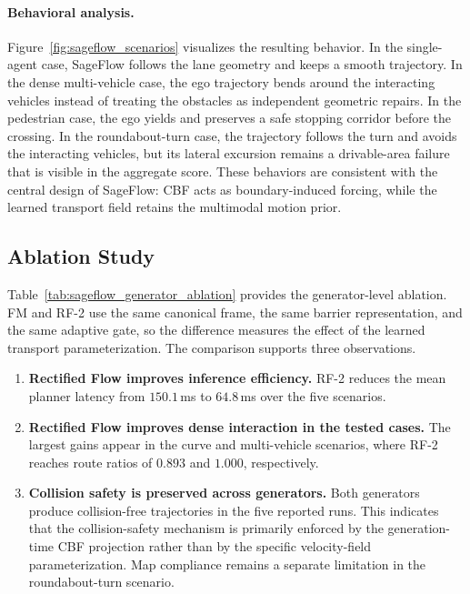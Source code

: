\paragraph{Behavioral analysis.}
Figure~\ref{fig:sageflow_scenarios} visualizes the resulting behavior.
In the single-agent case, SageFlow follows the lane geometry and keeps a
smooth trajectory.  In the dense multi-vehicle case, the ego trajectory bends
around the interacting vehicles instead of treating the obstacles as
independent geometric repairs.  In the pedestrian case, the ego yields
and preserves a safe stopping corridor before the crossing.
In the roundabout-turn case, the trajectory follows the turn and avoids
the interacting vehicles, but its lateral excursion remains a
drivable-area failure that is visible in the aggregate score.
These behaviors are consistent with the central design of SageFlow:
CBF acts as boundary-induced forcing, while the learned transport field
retains the multimodal motion prior.

\subsection{Ablation Study}

Table~\ref{tab:sageflow_generator_ablation} provides the generator-level
ablation.  FM and RF-2 use the same canonical frame, the same barrier
representation, and the same adaptive gate, so the difference measures
the effect of the learned transport parameterization.  The comparison
supports three observations.

\begin{enumerate}
    \item \textbf{Rectified Flow improves inference efficiency.}
    RF-2 reduces the mean planner latency from \(150.1\)\,ms to
    \(64.8\)\,ms over the five scenarios.

    \item \textbf{Rectified Flow improves dense interaction in the
    tested cases.}  The largest gains appear in the curve and
    multi-vehicle scenarios, where RF-2 reaches route ratios of
    \(0.893\) and \(1.000\), respectively.

    \item \textbf{Collision safety is preserved across generators.}
    Both generators produce collision-free trajectories in the five
    reported runs.  This indicates that the collision-safety mechanism is
    primarily enforced by the generation-time CBF projection rather
    than by the specific velocity-field parameterization.  Map
    compliance remains a separate limitation in the roundabout-turn
    scenario.
\end{enumerate}

